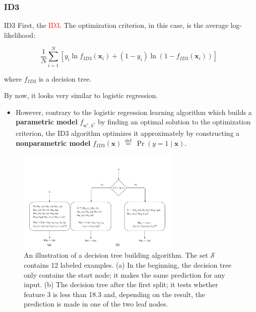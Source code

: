 \documentclass[9pt,dvipsnames]{beamer}
\begin{document}
	\subsubsection{ID3}
	\begin{frame}{ID3}
		First, the \textcolor{red}{ID3}. 
		The optimization criterion, in this case, is the average log-likelihood:
		
		$$
		\frac{1}{N} \sum_{i=1}^{N}\left[y_{i} \ln f_{I D 3}\left(\mathbf{x}_{i}\right)+\left(1-y_{i}\right) \ln \left(1-f_{I D 3}\left(\mathbf{x}_{i}\right)\right)\right]
		$$
		
		where $f_{I D 3}$ is a decision tree.
		
		By now, it looks very similar to logistic regression. 
		\begin{itemize}
			\item However, contrary to the logistic regression learning algorithm which builds a \textbf{parametric model} $f_{\mathrm{w}^{*}, b^{*}}$ by finding an optimal solution to the optimization criterion, the ID3 algorithm optimizes it approximately by constructing a \textbf{nonparametric model} $f_{I D 3}(\mathbf{x}) \stackrel{\text { def }}{=} \operatorname{Pr}(y=1 \mid \mathbf{x})$.
		\end{itemize}
	\end{frame}
	
	\begin{frame}
		\begin{figure}
			\centering
			\includegraphics[width=0.7\textwidth]{imgs/algorithm_4.png}
			\caption{An illustration of a decision tree building algorithm. The set $\mathcal{S}$ contains 12 labeled examples. (a) In the beginning, the decision tree only contains the start node; it makes the same prediction for any input. (b) The decision tree after the first split; it tests whether feature 3 is less than 18.3 and, depending on the result, the prediction is made in one of the two leaf nodes.}
		\end{figure}
	\end{frame}
	
\end{document}
